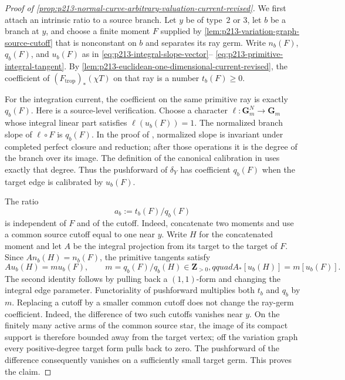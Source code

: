 \begin{proof}[Proof of
\cref{prop:p213-normal-curve-arbitrary-valuation-current-revised}]
We first attach an intrinsic ratio to a source branch.  Let $y$ be of
type~$2$ or $3$, let $b$ be a branch at $y$, and choose a finite moment
$F$ supplied by
\cref{lem:p213-variation-graph-source-cutoff} that is nonconstant on $b$
and separates its ray germ.  Write
$n_b(F)$, $q_b(F)$, and $u_b(F)$ as in
\eqref{eq:p213-integral-slope-vector}--
\eqref{eq:p213-primitive-integral-tangent}.  By
\cref{lem:p213-euclidean-one-dimensional-current-revised}, the coefficient
of $(F_{\mathrm{trop}})_*(\chi T)$ on that ray is a number
$t_b(F)\geq0$.

For the integration current, the coefficient on the same primitive ray
is exactly $q_b(F)$.  Here is a source-level verification.  Choose a
character $\ell:\mathbf G_m^N\to\mathbf G_m$ whose integral linear part
satisfies $\ell(u_b(F))=1$.  The normalized branch slope of
$\ell\circ F$ is $q_b(F)$.  In the proof of
\cite[\S4.5.21.4]{Ducros24CurveStructure}, normalized slope is invariant
under completed perfect closure and reduction; after those operations it
is the degree of the branch over its image.  The definition of the
canonical calibration in
\cite[Proposition~14.3.1 and \S14.3.2]{CLD25} uses exactly that degree.
Thus the pushforward of $\delta_Y$ has coefficient $q_b(F)$ when the
target edge is calibrated by $u_b(F)$.

The ratio
\begin{equation}
                              a_b:=t_b(F)/q_b(F)
\label{eq:p213-intrinsic-branch-ratio-revised}
\end{equation}
is independent of $F$ and of the cutoff.  Indeed, concatenate two moments
and use a common source cutoff equal to one near $y$.  Write $H$ for the
concatenated moment and let $A$ be the integral projection from its target
to the target of $F$.  Since
$A n_b(H)=n_b(F)$, the primitive tangents satisfy
\begin{equation}
       A u_b(H)=m u_b(F),\qquad
       m=q_b(F)/q_b(H)\in\mathbf Z_{>0},qquad
       A_*[u_b(H)]=m[u_b(F)].
\label{eq:p213-refinement-expansion-revised}
\end{equation}
The second identity follows by pulling back a $(1,1)$-form and changing
the integral edge parameter.  Functoriality of pushforward
\cite[\S7.1.11]{CLD25} multiplies both $t_b$ and $q_b$ by $m$.
Replacing a cutoff by a smaller common cutoff does not change the ray-germ
coefficient.  Indeed, the difference of two such cutoffs vanishes near
$y$.  On the finitely many active arms of the common source star, the
image of its compact support is therefore bounded away from the target
vertex; off the variation graph every positive-degree target form pulls
back to zero.  The pushforward of the difference consequently vanishes on
a sufficiently small target germ.  This proves the claim.


\end{proof}
